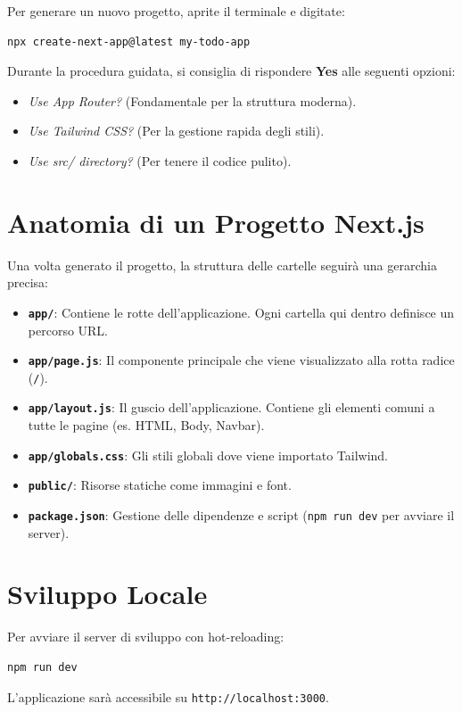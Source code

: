 \documentclass[11pt,a4paper]{report}
\begin{document}
Per generare un nuovo progetto, aprite il terminale e digitate:
\begin{lstlisting}[language=bash]
npx create-next-app@latest my-todo-app
\end{lstlisting}

Durante la procedura guidata, si consiglia di rispondere \textbf{Yes} alle seguenti opzioni:
\begin{itemize}
    \item \textit{Use App Router?} (Fondamentale per la struttura moderna).
    \item \textit{Use Tailwind CSS?} (Per la gestione rapida degli stili).
    \item \textit{Use src/ directory?} (Per tenere il codice pulito).
\end{itemize}

\section{Anatomia di un Progetto Next.js}
Una volta generato il progetto, la struttura delle cartelle seguirà una gerarchia precisa:

\begin{itemize}
    \item \textbf{\texttt{app/}}: Contiene le rotte dell'applicazione. Ogni cartella qui dentro definisce un percorso URL.
    \item \textbf{\texttt{app/page.js}}: Il componente principale che viene visualizzato alla rotta radice (\texttt{/}).
    \item \textbf{\texttt{app/layout.js}}: Il guscio dell'applicazione. Contiene gli elementi comuni a tutte le pagine (es. HTML, Body, Navbar).
    \item \textbf{\texttt{app/globals.css}}: Gli stili globali dove viene importato Tailwind.
    \item \textbf{\texttt{public/}}: Risorse statiche come immagini e font.
    \item \textbf{\texttt{package.json}}: Gestione delle dipendenze e script (\texttt{npm run dev} per avviare il server).
\end{itemize}

\section{Sviluppo Locale}
Per avviare il server di sviluppo con hot-reloading:
\begin{lstlisting}[language=bash]
npm run dev
\end{lstlisting}
L'applicazione sarà accessibile su \texttt{http://localhost:3000}.
\end{document}
